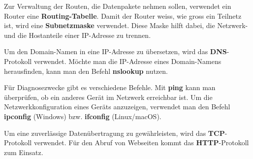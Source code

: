 \begin{myexercise}
\begin{myanswer}
        Zur Verwaltung der Routen, die Datenpakete nehmen sollen, verwendet ein Router eine \textbf{Routing-Tabelle}. Damit der Router weiss, wie gross ein Teilnetz ist, wird eine \textbf{Subnetzmaske} verwendet. Diese Maske hilft dabei, die Netzwerk- und die Hostanteile einer IP-Adresse zu trennen.

        Um den Domain-Namen in eine IP-Adresse zu übersetzen, wird das \textbf{DNS}-Protokoll verwendet. Möchte man die IP-Adresse eines Domain-Namens herausfinden, kann man den Befehl \textbf{nslookup} nutzen.

        Für Diagnosezwecke gibt es verschiedene Befehle. Mit \textbf{ping} kann man überprüfen, ob ein anderes Gerät im Netzwerk erreichbar ist. Um die Netzwerkkonfiguration eines Geräts anzuzeigen, verwendet man den Befehl \textbf{ipconfig} (Windows) bzw. \textbf{ifconfig} (Linux/macOS).

        Um eine zuverlässige Datenübertragung zu gewährleisten, wird das \textbf{TCP}-Protokoll verwendet. Für den Abruf von Webseiten kommt das \textbf{HTTP}-Protokoll zum Einsatz.
    \end{myanswer}
\end{myexercise}

